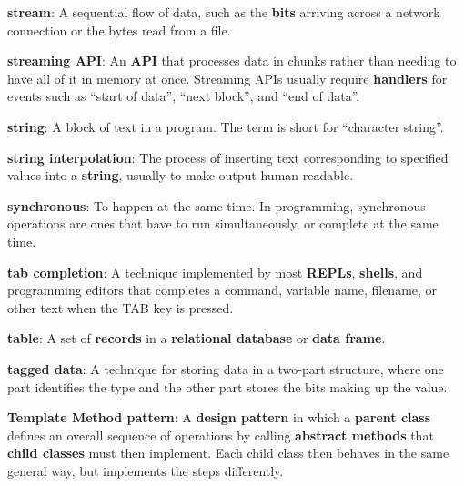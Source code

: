 \documentclass[krantzl]{krantz}
\newcommand{\glosskey}[1]{\textbf{#1}}
\begin{document}
\noindent \textbf{{\newline}\glosskey{stream}}: 
A sequential flow of data, such as the \glosskey{bits} arriving across a network connection or the bytes read from a file.


\noindent \textbf{{\newline}\glosskey{streaming API}}: 
An \glosskey{API} that processes data in chunks rather than needing to have all of it in memory at once. Streaming APIs usually require \glosskey{handlers} for events such as “start of data”, “next block”, and “end of data”.


\noindent \textbf{{\newline}\glosskey{string}}: 
A block of text in a program. The term is short for “character string”.


\noindent \textbf{{\newline}\glosskey{string interpolation}}: 
The process of inserting text corresponding to specified values into a \glosskey{string}, usually to make output human-readable.


\noindent \textbf{{\newline}\glosskey{synchronous}}: 
To happen at the same time. In programming, synchronous operations are ones that have to run simultaneously, or complete at the same time.


\noindent \textbf{{\newline}\glosskey{tab completion}}: 
A technique implemented by most \glosskey{REPLs}, \glosskey{shells}, and programming editors that completes a command, variable name, filename, or other text when the TAB key is pressed.


\noindent \textbf{{\newline}\glosskey{table}}: 
A set of \glosskey{records} in a \glosskey{relational database} or \glosskey{data frame}.


\noindent \textbf{{\newline}\glosskey{tagged data}}: 
A technique for storing data in a two-part structure, where one part identifies the type and the other part stores the bits making up the value.


\noindent \textbf{{\newline}\glosskey{Template Method pattern}}: 
A \glosskey{design pattern} in which a \glosskey{parent class} defines an overall sequence of operations by calling \glosskey{abstract methods} that \glosskey{child classes} must then implement. Each child class then behaves in the same general way, but implements the steps differently.
\end{document}
